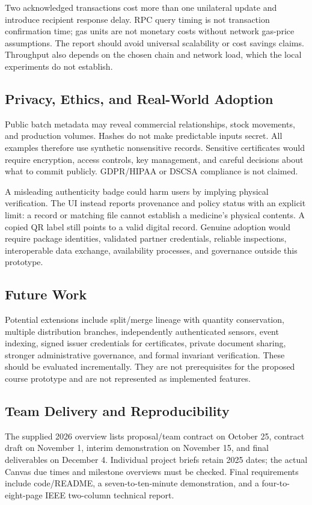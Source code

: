 Two acknowledged transactions cost more than one unilateral update and introduce recipient response delay. RPC query timing is not transaction confirmation time; gas units are not monetary costs without network gas-price assumptions. The report should avoid universal scalability or cost savings claims. Throughput also depends on the chosen chain and network load, which the local experiments do not establish.

\subsection{Privacy, Ethics, and Real-World Adoption}
Public batch metadata may reveal commercial relationships, stock movements, and production volumes. Hashes do not make predictable inputs secret. All examples therefore use synthetic nonsensitive records. Sensitive certificates would require encryption, access controls, key management, and careful decisions about what to commit publicly. GDPR/HIPAA or DSCSA compliance is not claimed.

A misleading authenticity badge could harm users by implying physical verification. The UI instead reports provenance and policy status with an explicit limit: a record or matching file cannot establish a medicine's physical contents. A copied QR label still points to a valid digital record. Genuine adoption would require package identities, validated partner credentials, reliable inspections, interoperable data exchange, availability processes, and governance outside this prototype.

\subsection{Future Work}
Potential extensions include split/merge lineage with quantity conservation, multiple distribution branches, independently authenticated sensors, event indexing, signed issuer credentials for certificates, private document sharing, stronger administrative governance, and formal invariant verification. These should be evaluated incrementally. They are not prerequisites for the proposed course prototype and are not represented as implemented features.

\subsection{Team Delivery and Reproducibility}
The supplied 2026 overview lists proposal/team contract on October 25, contract draft on November 1, interim demonstration on November 15, and final deliverables on December 4. Individual project briefs retain 2025 dates; the actual Canvas due times and milestone overviews must be checked. Final requirements include code/README, a seven-to-ten-minute demonstration, and a four-to-eight-page IEEE two-column technical report.

